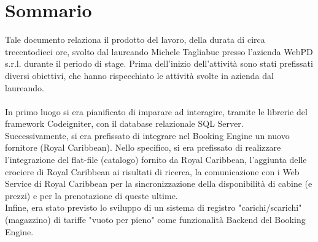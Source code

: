 
\cleardoublepage
{}
{}
\begingroup
\let\clearpage\relax
\let\cleardoublepage\relax
\let\cleardoublepage\relax

\chapter*{Sommario}

Tale documento relaziona il prodotto del lavoro, della durata di circa trecentodieci ore, svolto dal laureando Michele Tagliabue presso l'azienda WebPD s.r.l. durante il periodo di stage. Prima dell'inizio dell'attività sono stati prefissati diversi obiettivi, che hanno rispecchiato le attività svolte in azienda dal laureando.\\ \\
In primo luogo si era pianificato di imparare ad interagire, tramite le librerie del framework Codeigniter, con il database relazionale SQL Server. \\
Successivamente, si era prefissato di integrare nel Booking Engine un nuovo fornitore (Royal Caribbean). Nello specifico, si era prefissato di realizzare l'integrazione del flat-file (catalogo) fornito da Royal Caribbean, l'aggiunta delle crociere di Royal Caribbean ai risultati di ricerca, la comunicazione con i Web Service di Royal Caribbean per la sincronizzazione della disponibilità di cabine (e prezzi) e per la prenotazione di queste ultime.\\
Infine, era stato previsto lo sviluppo di un sistema di registro "carichi/scarichi" (magazzino) di tariffe "vuoto per pieno" come funzionalità Backend del Booking Engine.
%
%

\endgroup			

\vfill

